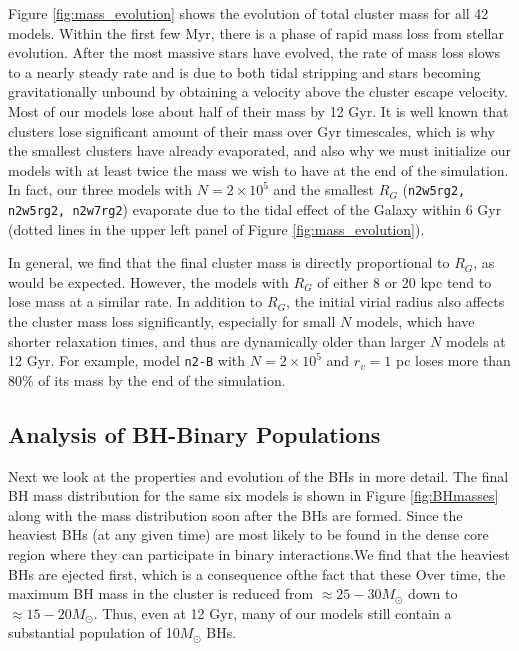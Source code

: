\documentclass[12pt,preprint]{aastex}
\begin{document}
Figure \ref{fig:mass_evolution} 
shows the evolution of total cluster mass for all 42 models.  Within the first 
few Myr, there is a phase of rapid mass loss from stellar evolution. After the most massive 
stars have evolved, the rate of mass loss slows to a nearly steady rate and is due to both 
tidal stripping and stars becoming gravitationally unbound by obtaining a velocity above
the cluster escape velocity. Most of our models lose about half of their mass by 12 Gyr. 
It is well known that clusters lose significant amount of their mass over Gyr timescales, which
is why the smallest clusters have already evaporated, and also why we must initialize
our models with at least twice the mass we wish to have at the end of the simulation.
In fact, our three models with $N=2 \times 10^5$ and the smallest  $R_G$ 
(\texttt{n2w5rg2, n2w5rg2, n2w7rg2}) evaporate due to the tidal effect of the 
Galaxy within 6 Gyr (dotted lines in the upper
left panel of Figure \ref{fig:mass_evolution}). 

In general, we find that the final cluster mass is directly proportional to $R_G$, as would be
expected. However, the models with $R_G$ of either 8  or 20 kpc tend to lose mass at a similar rate.
In addition to $R_G$, the initial virial radius also affects the cluster mass loss significantly, 
especially for small $N$ models, which have shorter relaxation times, and thus are dynamically
older than larger $N$ models at 12 Gyr. For example, model \texttt{n2-B} with $N=2 \times 10^5$ and 
$r_v=1$ pc loses more than 80\% of its mass by the end of the simulation.  



\subsection{Analysis of BH-Binary Populations}

Next we look at the properties and evolution of the BHs in more detail.
The final BH mass distribution for the same six models is shown in Figure \ref{fig:BHmasses}
along with the mass distribution soon after the BHs are formed. Since the heaviest BHs 
(at any given time) are most likely to be found in the dense core region where they can 
participate in binary interactions.We find that the heaviest BHs
are ejected first, which is a consequence ofthe fact that these  Over time,
the maximum BH mass in the cluster is reduced from $\approx 25-30 M_\odot$ down to 
$\approx 15-20 M_\odot$. Thus, even at 12 Gyr, many of our models still contain a
substantial population of 10$M_\odot$ BHs.
\end{document}

